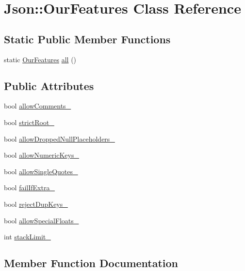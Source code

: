 \hypertarget{classJson_1_1OurFeatures}{}\section{Json\+:\+:Our\+Features Class Reference}
\label{classJson_1_1OurFeatures}
\subsection*{Static Public Member Functions}
\begin{DoxyCompactItemize}
\item 
static \hyperlink{classJson_1_1OurFeatures}{Our\+Features} \hyperlink{classJson_1_1OurFeatures_a0686e1406b6677f496529f9f3fe98d1e}{all} ()
\end{DoxyCompactItemize}
\subsection*{Public Attributes}
\begin{DoxyCompactItemize}
\item 
bool \hyperlink{classJson_1_1OurFeatures_ac71bb7ba7363d3b05ed76602b036ce33}{allow\+Comments\+\_\+}
\item 
bool \hyperlink{classJson_1_1OurFeatures_a2095f66a776c0a4ae6cc931a0c94242e}{strict\+Root\+\_\+}
\item 
bool \hyperlink{classJson_1_1OurFeatures_a13963bc44bf948eec1968f7ff8e8f5f1}{allow\+Dropped\+Null\+Placeholders\+\_\+}
\item 
bool \hyperlink{classJson_1_1OurFeatures_af6973fc7e774ce2d634ba99442aeb91a}{allow\+Numeric\+Keys\+\_\+}
\item 
bool \hyperlink{classJson_1_1OurFeatures_abbd6c196d7a22e2a360a59887eda4610}{allow\+Single\+Quotes\+\_\+}
\item 
bool \hyperlink{classJson_1_1OurFeatures_ae8ad25b90706c78f1a8fe929191ac61b}{fail\+If\+Extra\+\_\+}
\item 
bool \hyperlink{classJson_1_1OurFeatures_a39b8e0b86b1c24a45e800c023bb715aa}{reject\+Dup\+Keys\+\_\+}
\item 
bool \hyperlink{classJson_1_1OurFeatures_af760f91cc2a7af37e44f78fb466061bb}{allow\+Special\+Floats\+\_\+}
\item 
int \hyperlink{classJson_1_1OurFeatures_a9a786713902d14be6d57a08cc03ccfff}{stack\+Limit\+\_\+}
\end{DoxyCompactItemize}


\subsection{Member Function Documentation}
